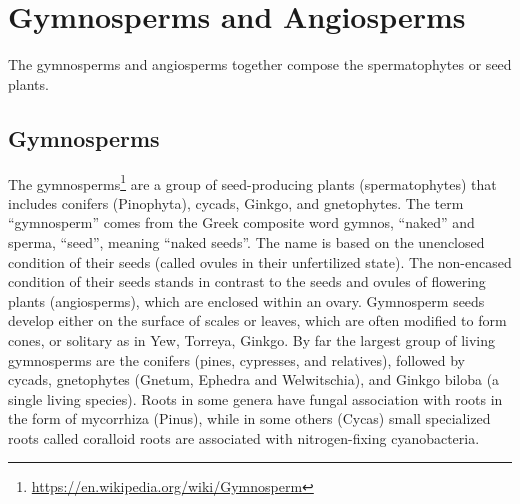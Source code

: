 \documentclass[]{book}
\let\rmarkdownfootnote\footnote%
\def\footnote{\protect\rmarkdownfootnote}
\renewcommand{\href}[2]{#2\footnote{\url{#1}}}
\theoremstyle{definition}
\theoremstyle{definition}
\theoremstyle{definition}
\theoremstyle{remark}
\begin{document}
\chapter{Gymnosperms and Angiosperms}\label{gymnosperms-and-angiosperms}

The gymnosperms and angiosperms together compose the spermatophytes or
seed plants.

\section{Gymnosperms}\label{gymnosperms}

The \href{https://en.wikipedia.org/wiki/Gymnosperm}{gymnosperms} are a
group of seed-producing plants (spermatophytes) that includes conifers
(Pinophyta), cycads, Ginkgo, and gnetophytes. The term ``gymnosperm''
comes from the Greek composite word gymnos, ``naked'' and sperma,
``seed'', meaning ``naked seeds''. The name is based on the unenclosed
condition of their seeds (called ovules in their unfertilized state).
The non-encased condition of their seeds stands in contrast to the seeds
and ovules of flowering plants (angiosperms), which are enclosed within
an ovary. Gymnosperm seeds develop either on the surface of scales or
leaves, which are often modified to form cones, or solitary as in Yew,
Torreya, Ginkgo. By far the largest group of living gymnosperms are the
conifers (pines, cypresses, and relatives), followed by cycads,
gnetophytes (Gnetum, Ephedra and Welwitschia), and Ginkgo biloba (a
single living species). Roots in some genera have fungal association
with roots in the form of mycorrhiza (Pinus), while in some others
(Cycas) small specialized roots called coralloid roots are associated
with nitrogen-fixing cyanobacteria.
\end{document}
